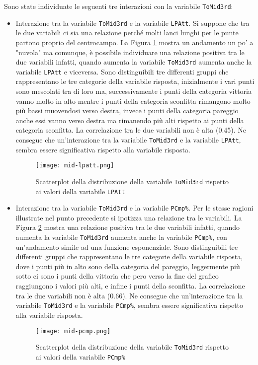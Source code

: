 Sono state individuate le seguenti tre interazioni con la variabile \texttt{ToMid3rd}:
\begin{itemize}
	\item Interazione tra la variabile \texttt{ToMid3rd} e la variabile \texttt{LPAtt}. Si suppone che tra le due variabili ci sia una relazione perché molti lanci lunghi per le punte partono proprio del centrocampo. La Figura \ref{fig:midl} mostra un andamento un po' a "nuvola" ma comunque, è possibile individuare una relazione positiva tra le due variabili infatti, quando aumenta la variabile \texttt{ToMid3rd} aumenta anche la variabile \texttt{LPAtt} e viceversa. Sono distinguibili tre differenti gruppi che rappresentano le tre categorie della variabile risposta, inizialmente i vari punti sono mescolati tra di loro ma, successivamente i punti della categoria vittoria vanno molto in alto mentre i punti della categoria sconfitta rimangono molto più bassi muovendosi verso destra, invece i punti della categoria pareggio anche essi vanno verso destra ma rimanendo più alti rispetto ai punti della categoria sconfitta. La correlazione tra le due variabili non è alta (0.45). Ne consegue che un'interazione tra la variabile \texttt{ToMid3rd} e la variabile \texttt{LPAtt}, sembra essere significativa rispetto alla variabile risposta.
	\begin{figure}[htbp]
		\begin{center}
			\texttt{[image: mid-lpatt.png]}
			\caption{Scatterplot della distribuzione della variabile \texttt{ToMid3rd} rispetto ai valori della variabile \texttt{LPAtt}}  \label{fig:midl}
		\end{center}
	\end{figure}
	
	\item Interazione tra la variabile \texttt{ToMid3rd} e la variabile \texttt{PCmp\%}. Per le stesse ragioni illustrate nel punto precedente si ipotizza una relazione tra le variabili. La Figura \ref{fig:midp} mostra una relazione positiva tra le due variabili infatti, quando aumenta la variabile \texttt{ToMid3rd} aumenta anche la variabile \texttt{PCmp\%}, con un'andamento simile ad una funzione esponenziale. Sono distinguibili tre differenti gruppi che rappresentano le tre categorie della variabile risposta, dove i punti più in alto sono della categoria del pareggio, leggermente più sotto ci sono i punti della vittoria che pero verso la fine del grafico raggiungono i valori più alti, e infine i punti della sconfitta. La correlazione tra le due variabili non è alta (0.66). Ne consegue che un'interazione tra la variabile \texttt{ToMid3rd} e la variabile \texttt{PCmp\%}, sembra essere significativa rispetto alla variabile risposta.
	
	\begin{figure}[htbp]
		\begin{center}
			\texttt{[image: mid-pcmp.png]}
			\caption{Scatterplot della distribuzione della variabile \texttt{ToMid3rd} rispetto ai valori della variabile \texttt{PCmp\%}}  \label{fig:midp}
		\end{center}
	\end{figure}
\end{itemize}


